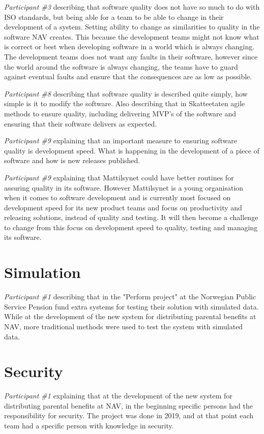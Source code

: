 \textit{Participant \#3} describing that software quality does not have so much to do with ISO standards, but being able for a team to be able to change in their development of a system. Setting ability to change as similarities to quality in the software NAV creates. This because the development teams might not know what is correct or best when developing software in a world which is always changing. The development teams does not want any faults in their software, however since the world around the software is always changing, the teams have to guard against eventual faults and ensure that the consequences are as low as possible.

\textit{Participant \#8} describing that software quality is described quite simply, how simple is it to modify the software. Also describing that in Skatteetaten agile methods to ensure quality, including delivering MVP's of the software and ensuring that their software delivers as expected.

\textit{Participant \#9} explaining that an important measure to ensuring software quality is development speed. What is happening in the development of a piece of software and how is new releases published.

\textit{Participant \#9} explaining that Mattilsynet could have better routines for assuring quality in its software. However Mattilsynet is a young organisation when it comes to software development and is currently most focused on development speed for its new product teams and focus on productivity and releasing solutions, instead of quality and testing. It will then become a challenge to change from this focus on development speed to quality, testing and managing its software.

\section{Simulation}
\textit{Participant \#1} describing that in the "Perform project" at the Norwegian Public Service Pension fund extra systems for testing their solution with simulated data. While at the development of the new system for distributing parental benefits at NAV, more traditional methods were used to test the system with simulated data.

\section{Security}
\textit{Participant \#1} explaining that at the development of the new system for distributing parental benefits at NAV, in the beginning specific persons had the responsibility for security. The project was done in 2019, and at that point each team had a specific person with knowledge in security. 

